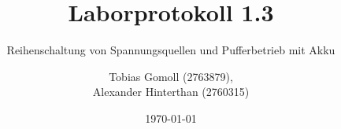 \title{Laborprotokoll 1.3}
\subtitle{Reihenschaltung von Spannungsquellen und Pufferbetrieb mit Akku}
\author{Tobias Gomoll (2763879),\\ Alexander Hinterthan (2760315)}
\date{\today{}}
\newcommand{\abgabetermin}{07.06.2024}
\newcommand{\labdate}{24.05.2024}